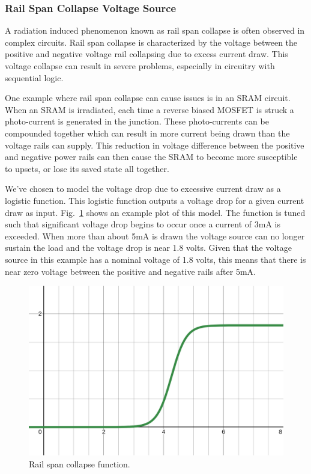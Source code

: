 \documentclass[conference]{IEEEtran}
\begin{document}
    \vspace{1em}

    \subsubsection{Rail Span Collapse Voltage Source}
    A radiation induced phenomenon known as rail span collapse is often observed in complex circuits.
    Rail span collapse is characterized by the voltage between the positive and negative voltage rail collapsing due to excess current draw.
    This voltage collapse can result in severe problems, especially in circuitry with sequential logic.

    One example where rail span collapse can cause issues is in an SRAM circuit.
    When an SRAM is irradiated, each time a reverse biased MOSFET is struck a photo-current is generated in the junction.
    These photo-currents can be compounded together which can result in more current being drawn than the voltage rails can supply.
    This reduction in voltage difference between the positive and negative power rails can then cause the SRAM to become more susceptible to upsets, or lose its saved state all together.

    We've chosen to model the voltage drop due to excessive current draw as a logistic function.
    This logistic function outputs a voltage drop for a given current draw as input.
    Fig.~\ref{fig:rail_collapse_function} shows an example plot of this model.
    The function is tuned such that significant voltage drop begins to occur once a current of 3mA is exceeded.
    When more than about 5mA is drawn the voltage source can no longer sustain the load and the voltage drop is near 1.8 volts.
    Given that the voltage source in this example has a nominal voltage of 1.8 volts, this means that there is near zero voltage between the positive and negative rails after 5mA\@.

    \begin{figure}[htbp]
        \centering
        \includegraphics[width=0.95\linewidth]{rail_collapse_function}
        \caption{Rail span collapse function.}
        \label{fig:rail_collapse_function}
    \end{figure}
\end{document}
